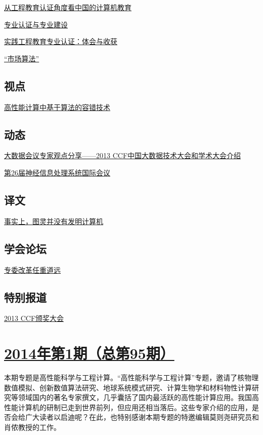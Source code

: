 \documentclass[a4paper]{article}
\begin{document}
\href{http://history.ccf.org.cn/resources/1190201776262/2014/02/17/7.pdf}{从工程教育认证角度看中国的计算机教育}

\href{http://history.ccf.org.cn/resources/1190201776262/2014/02/17/9.pdf}{专业认证与专业建设}

\href{http://history.ccf.org.cn/resources/1190201776262/2014/02/17/10.pdf}{实践工程教育专业认证：体会与收获}

\href{http://history.ccf.org.cn/resources/1190201776262/2014/02/17/11.pdf}{“市场算法”}

\subsection{视点}
\href{http://history.ccf.org.cn/resources/1190201776262/2014/02/17/12.pdf}{高性能计算中基于算法的容错技术}

\subsection{动态}
\href{http://history.ccf.org.cn/resources/1190201776262/2014/02/17/14.pdf}{大数据会议专家观点分享——2013 CCF中国大数据技术大会和学术大会介绍}

\href{http://history.ccf.org.cn/resources/1190201776262/2014/02/17/13.pdf}{第26届神经信息处理系统国际会议}

\subsection{译文}
\href{http://history.ccf.org.cn/resources/1190201776262/2014/02/17/15.pdf}{事实上，图灵并没有发明计算机}

\subsection{学会论坛}
\href{http://history.ccf.org.cn/resources/1190201776262/2014/02/17/16.pdf}{专委改革任重道远}

\subsection{特别报道}
\href{http://history.ccf.org.cn/resources/1190201776262/2014/02/17/0.pdf}{2013 CCF颁奖大会}


\section{\href{http://history.ccf.org.cn/sites/ccf/jsjtbbd.jsp?contentId=2779113649284}{\textbf{2014年第1期（总第95期）}}}
本期专题是高性能科学与工程计算。“高性能科学与工程计算”专题，邀请了核物理数值模拟、创新数值算法研究、地球系统模式研究、计算生物学和材料物性计算研究等领域国内的著名专家撰文，几乎囊括了国内最活跃的高性能计算应用。我国高性能计算机的研制已走到世界前列，但应用还相当落后。这些专家介绍的应用，是否会给广大读者以启迪呢？在此，也特别感谢本期专题的特邀编辑莫则尧研究员和肖侬教授的工作。
\end{document}
